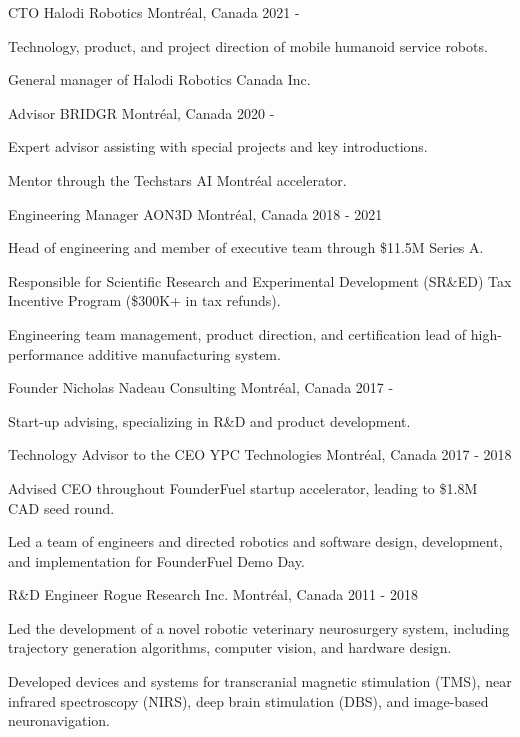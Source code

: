 \begin{cventries}

\cventry
{CTO}
{Halodi Robotics}
{Montréal, Canada}
{2021 - }
{
\begin{cvitems}
\item{Technology, product, and project direction of mobile humanoid service robots.}
\item{General manager of Halodi Robotics Canada Inc.}
\end{cvitems}
}

\cventry
{Advisor}
{BRIDGR}
{Montréal, Canada}
{2020 - }
{
\begin{cvitems}
\item{Expert advisor assisting with special projects and key introductions.}
\item{Mentor through the Techstars AI Montréal accelerator.}
\end{cvitems}
}

\cventry
{Engineering Manager}
{AON3D}
{Montréal, Canada}
{2018 - 2021}
{
\begin{cvitems}
\item{Head of engineering and member of executive team through \$11.5M Series A.}
\item{Responsible for Scientific Research and Experimental Development (SR\&ED) Tax Incentive Program (\$300K+ in tax refunds).}
\item{Engineering team management, product direction, and certification lead of high-performance additive manufacturing system.}
\end{cvitems}
}

\cventry
{Founder}
{Nicholas Nadeau Consulting}
{Montréal, Canada}
{2017 - }
{
\begin{cvitems}
\item{Start-up advising, specializing in R\&D and product development.}
\end{cvitems}
}

\cventry
{Technology Advisor to the CEO}
{YPC Technologies}
{Montréal, Canada}
{2017 - 2018}
{
\begin{cvitems}
\item{Advised CEO throughout FounderFuel startup accelerator, leading to \$1.8M CAD seed round.}
\item{Led a team of engineers and directed robotics and software design, development, and implementation for FounderFuel Demo Day.}
\end{cvitems}
}

\cventry
{R\&D Engineer}
{Rogue Research Inc.}
{Montréal, Canada}
{2011 - 2018}
{
\begin{cvitems}
\item{Led the development of a novel robotic veterinary neurosurgery system, including trajectory generation algorithms, computer vision, and hardware design.}
\item{Developed devices and systems for transcranial magnetic stimulation (TMS), near infrared spectroscopy (NIRS), deep brain stimulation (DBS), and image-based neuronavigation.}
\end{cvitems}
}

\end{cventries}
